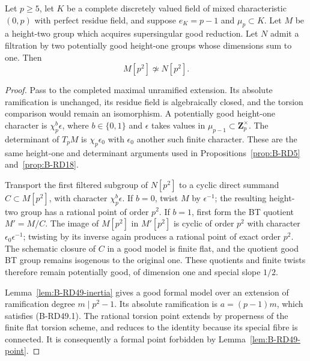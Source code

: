 \begin{proposition}
\label{prop:B-RD49-mixed}
Let $p\geq5$, let $K$ be a complete discretely valued field of mixed
characteristic $(0,p)$ with perfect residue field, and suppose
$e_K=p-1$ and $\mu_p\subset K$.
Let $M$ be a height-two group which acquires supersingular good
reduction. Let $N$ admit a filtration by two potentially good
height-one groups whose dimensions sum to one. Then
\[
                            M[p^2]\not\simeq N[p^2].    \tag{B-RD49.8}
\]
\end{proposition}
\begin{proof}
Pass to the completed maximal unramified extension. Its absolute
ramification is unchanged, its residue field is algebraically
closed, and the torsion comparison would remain an isomorphism.
A potentially good height-one character is
$\chi_p^b\epsilon$, where $b\in\{0,1\}$ and
$\epsilon$ takes values in $\mu_{p-1}\subset\mathbf Z_p^\times$.
The determinant of $T_pM$ is $\chi_p\epsilon_0$ with
$\epsilon_0$ another such finite character. These are the same
height-one and determinant arguments used in
Propositions~\ref{prop:B-RD5} and~\ref{prop:B-RD18}.

Transport the first filtered subgroup of $N[p^2]$ to a cyclic
direct summand $C\subset M[p^2]$, with character
$\chi_p^b\epsilon$. If $b=0$, twist $M$ by $\epsilon^{-1}$;
the resulting height-two group has a rational point of order
$p^2$. If $b=1$, first form the BT quotient $M'=M/C$.
The image of $M[p^2]$ in $M'[p^2]$ is cyclic of order $p^2$
with character $\epsilon_0\epsilon^{-1}$; twisting by its
inverse again produces a rational point of exact order $p^2$.
The schematic closure of $C$ in a good model is finite flat,
and the quotient good BT group remains isogenous to the
original one. These quotients and finite twists therefore remain
potentially good, of dimension one and special slope $1/2$.

Lemma~\ref{lem:B-RD49-inertia} gives a good formal model over
an extension of ramification degree $m\mid p^2-1$.
Its absolute ramification is $a=(p-1)m$, which satisfies
(B-RD49.1). The rational torsion point extends by properness of
the finite flat torsion scheme, and reduces to the identity
because its special fibre is connected. It is consequently a
formal point forbidden by Lemma~\ref{lem:B-RD49-point}.
\end{proof}

